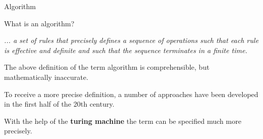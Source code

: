 \documentclass[11pt,compress,t,notes=noshow, xcolor=table]{beamer}
\begin{document}
\begin{vbframe}{Algorithm}
\framebreak

What is an algorithm?

\lz

\emph{... a set of rules that precisely defines a sequence of operations such that each rule is effective and definite and such that the sequence terminates in a finite time.} \\

\lz




The above definition of the term algorithm is comprehensible, but mathematically inaccurate.

\lz

To receive a more precise definition, a number of approaches have been developed in the first half of the 20th century.

\lz

With the help of the \textbf{turing machine} the term can be specified much more precisely.

\end{vbframe}
\end{document}
